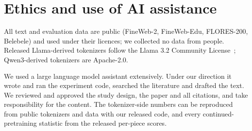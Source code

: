 \section*{Ethics and use of AI assistance}

All text and evaluation data are public (FineWeb-2, FineWeb-Edu, FLORES-200, Belebele) and used under their licences; we collected no data from people. Released Llama-derived tokenizers follow the Llama 3.2 Community License~\citep{llama32license}; Qwen3-derived tokenizers are Apache-2.0.

We used a large language model assistant extensively. Under our direction it wrote and ran the experiment code, searched the literature and drafted the text. We reviewed and approved the study design, the paper and all citations, and take responsibility for the content. The tokenizer-side numbers can be reproduced from public tokenizers and data with our released code, and every continued-pretraining statistic from the released per-piece scores.
